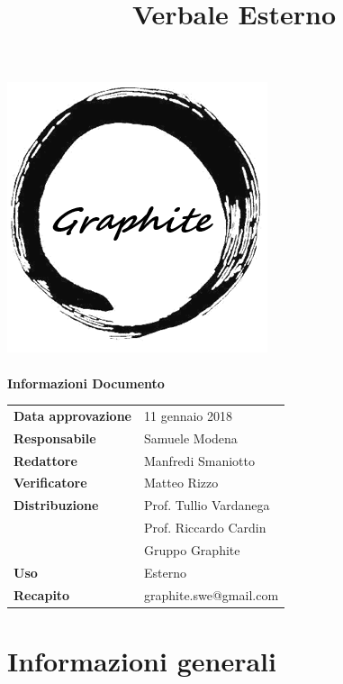 \documentclass[openany,12pt,a4paper]{article}
\title{Verbale Esterno}
\author{}
\begin{document}
 
  \makeatletter 
  \begin{titlepage} 
    \setlength{\headsep}{0pt}   
    \begin{center} 
      \includegraphics[width=0.5\linewidth]{Logo.png}\\[1em] 
      {\huge \bfseries  \@title }\\[10ex] 
      \textbf{\Large Informazioni Documento} \\[2em] 
      \bgroup 
      \def\arraystretch{1.5} 
      \begin{tabular}{l|l} 
        \textbf{Data approvazione} & 11 gennaio 2018 \\ 
        \textbf{Responsabile} & Samuele Modena \\ 
        \textbf{Redattore} & Manfredi Smaniotto \\ 
        \textbf{Verificatore} & Matteo Rizzo \\ 
        \textbf{Distribuzione} & Prof. Tullio Vardanega \\ 
         & Prof. Riccardo Cardin \\ 
         & Gruppo Graphite \\ 
        \textbf{Uso} & Esterno \\ 
        \textbf{Recapito} & graphite.swe@gmail.com \\ 
      \end{tabular} 
    \egroup 
    \end{center} 
  \end{titlepage} 
  \makeatother 
 
  \thispagestyle{empty} 
  \newpage 
   
  \tableofcontents 
  \newpage 
   
  \section{Informazioni generali} 
   
\end{document}
